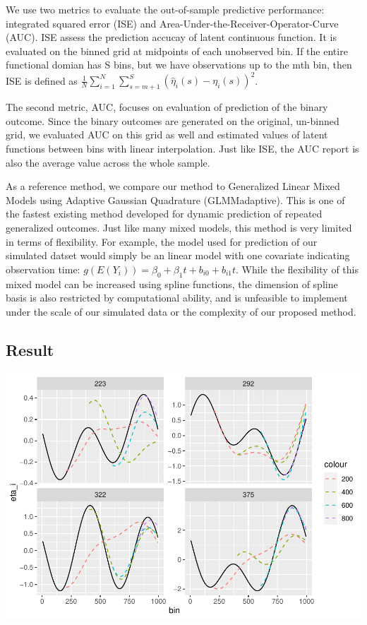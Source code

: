 \documentclass[
  11pt,
]{article}
\begin{document}
We use two metrics to evaluate the out-of-sample predictive performance:
integrated squared error (ISE) and
Area-Under-the-Receiver-Operator-Curve (AUC). ISE assess the prediction
accucay of latent continuous function. It is evaluated on the binned
grid at midpoints of each unobserved bin. If the entire functional
domian has S bins, but we have observations up to the mth bin, then ISE
is defined as
\(\frac{1}{N}\sum_{i=1}^N\sum_{s=m+1}^S(\hat{\eta}_i(s)-\eta_i(s))^2\).

The second metric, AUC, focuses on evaluation of prediction of the
binary outcome. Since the binary outcomes are generated on the original,
un-binned grid, we evaluated AUC on this grid as well and estimated
values of latent functions between bins with linear interpolation. Just
like ISE, the AUC report is also the average value across the whole
sample.

As a reference method, we compare our method to Generalized Linear Mixed
Models using Adaptive Gaussian Quadrature (GLMMadaptive). This is one of
the fastest existing method developed for dynamic prediction of repeated
generalized outcomes. Just like many mixed models, this method is very
limited in terms of flexibility. For example, the model used for
prediction of our simulated datset would simply be an linear model with
one covariate indicating observation time:
\(g(E(Y_i)) = \beta_0+\beta_1t+b_{i0}+b_{i1}t\). While the flexibility
of this mixed model can be increased using spline functions, the
dimension of spline basis is also restricted by computational ability,
and is unfeasible to implement under the scale of our simulated data or
the complexity of our proposed method.

\hypertarget{result}{%
\subsection{Result}\label{result}}

\includegraphics{Manuscript_files/figure-latex/unnamed-chunk-2-1.pdf}
\end{document}
